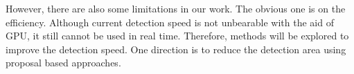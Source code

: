 \documentclass[twocolumn]{svjour3}
\begin{document}
However, there are also some limitations in our work. The obvious one is on the efficiency. Although current detection speed is not unbearable with the aid of GPU, it still cannot be used in real time. Therefore, methods will be explored to improve the detection speed. One direction is to reduce the detection area using proposal based approaches. 
 








\end{document}
